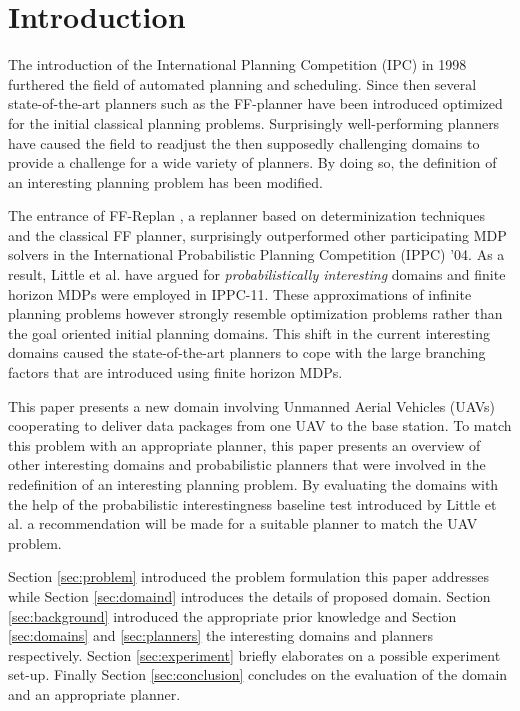 \documentclass[runningheads,a4paper]{llncs}
\begin{document}

\section{Introduction}
The introduction of the International Planning Competition (IPC) in 1998 furthered the field of automated planning and scheduling. Since then several state-of-the-art planners such as the FF-planner \cite{Hoffmann01theff} have been introduced optimized for the initial classical planning problems. Surprisingly well-performing planners have caused the field to readjust the then supposedly challenging domains to provide a challenge for a wide variety of planners. By doing so, the definition of an interesting planning problem has been modified.

The entrance of FF-Replan \cite{FFReplan}, a replanner based on determinization techniques and the classical FF planner, surprisingly outperformed other participating MDP solvers in the International Probabilistic Planning Competition (IPPC) '04. As a result, Little et al. have argued for \emph{probabilistically interesting} domains \cite{little2007probvsreplan} and finite horizon MDPs were employed in IPPC-11. These approximations of infinite planning problems however strongly resemble optimization problems rather than the goal oriented initial planning domains.  This shift in the current interesting domains caused the state-of-the-art planners to cope with the large branching factors that are introduced using finite horizon MDPs.

This paper presents a new domain involving Unmanned Aerial Vehicles (UAVs) cooperating to deliver data packages from one UAV to the base station. To match this problem with an appropriate planner, this paper presents an overview of other interesting domains and probabilistic planners that were involved in the redefinition of an interesting planning problem. By evaluating the domains with the help of the probabilistic interestingness baseline test introduced by Little et al. \cite{little2007probvsreplan} a recommendation will be made for a suitable planner to match the UAV problem.

Section \ref{sec:problem} introduced the problem formulation this paper addresses while Section \ref{sec:domaind} introduces the details of proposed domain. Section \ref{sec:background} introduced the appropriate prior knowledge and Section \ref{sec:domains} and \ref{sec:planners} the interesting domains and planners respectively. Section \ref{sec:experiment} briefly elaborates on a possible experiment set-up. Finally Section \ref{sec:conclusion} concludes on the evaluation of the domain and an appropriate planner.
\end{document}
